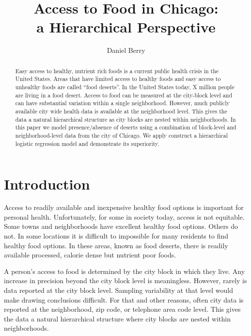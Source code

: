 \documentclass{report}
\title{Access to Food in Chicago: \\ a Hierarchical Perspective}
\author{Daniel Berry}
\begin{document}
\maketitle

\begin{abstract}
  Easy access to healthy, nutrient rich foods is a current public health crisis in the United States. Areas that have limited access to healthy foods and easy access to unhealthy foods are called ``food deserts''.  %
  In the United States today, X million people are living in a food desert. %
  Access to food can be measured at the city-block level and can have substantial variation within a single neighborhood. However, much publicly available city wide health data is available at the neighborhood level. This gives the data a natural hierarchical structure as city blocks are nested within neighborhoods. In this paper we model presence/absence of deserts using a combination of block-level and neighborhood-level data from the city of Chicago. We apply construct a hierarchical logistic regression model and demonstrate its superiority. 
\end{abstract}


\section*{Introduction}
Access to readily available and inexpensive healthy food options is important for personal health. Unfortunately, for some in society today, access is not equitable. Some towns and neighborhoods have excellent healthy food options. Others do not. In some locations it is difficult to impossible for many residents to find healthy food options. In these areas, known as food deserts, there is readily available processed, calorie dense but nutrient poor foods.

A person's access to food is determined by the city block in which they live. Any increase in precision beyond the city block level is meaningless. However, rarely is data reported at the city block level. Sampling variability at that level would make drawing conclusions difficult. For that and other reasons, often city data is reported at the neighborhood, zip code, or telephone area code level. This gives the data a natural hierarchical structure where city blocks are nested within neighborhoods. 
\end{document}
